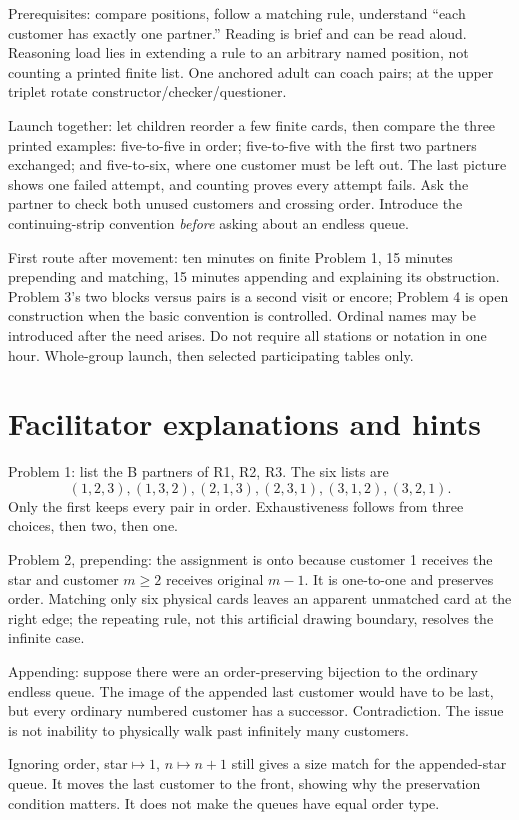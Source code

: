 \documentclass[11pt,letterpaper]{article}
\begin{document}
Prerequisites: compare positions, follow a matching rule, understand ``each customer has exactly one partner.'' Reading is brief and can be read aloud. Reasoning load lies in extending a rule to an arbitrary named position, not counting a printed finite list. One anchored adult can coach pairs; at the upper triplet rotate constructor/checker/questioner.

Launch together: let children reorder a few finite cards, then compare the three printed examples: five-to-five in order; five-to-five with the first two partners exchanged; and five-to-six, where one customer must be left out. The last picture shows one failed attempt, and counting proves every attempt fails. Ask the partner to check both unused customers and crossing order. Introduce the continuing-strip convention \emph{before} asking about an endless queue.

First route after movement: ten minutes on finite Problem 1, 15 minutes prepending and matching, 15 minutes appending and explaining its obstruction. Problem 3's two blocks versus pairs is a second visit or encore; Problem 4 is open construction when the basic convention is controlled. Ordinal names may be introduced after the need arises. Do not require all stations or notation in one hour. Whole-group launch, then selected participating tables only.
\newpage
\section*{Facilitator explanations and hints}
Problem 1: list the B partners of R1, R2, R3. The six lists are\[ (1,2,3),(1,3,2),(2,1,3),(2,3,1),(3,1,2),(3,2,1). \] Only the first keeps every pair in order. Exhaustiveness follows from three choices, then two, then one.

Problem 2, prepending: the assignment is onto because customer 1 receives the star and customer $m\ge2$ receives original $m-1$. It is one-to-one and preserves order. Matching only six physical cards leaves an apparent unmatched card at the right edge; the repeating rule, not this artificial drawing boundary, resolves the infinite case.

Appending: suppose there were an order-preserving bijection to the ordinary endless queue. The image of the appended last customer would have to be last, but every ordinary numbered customer has a successor. Contradiction. The issue is not inability to physically walk past infinitely many customers.

Ignoring order, star$\mapsto1$, $n\mapsto n+1$ still gives a size match for the appended-star queue. It moves the last customer to the front, showing why the preservation condition matters. It does not make the queues have equal order type.
\end{document}

